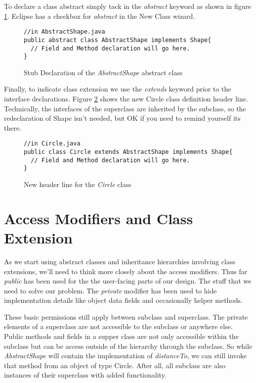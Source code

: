 \documentclass[]{tufte-handout}
\begin{document}
To declare a class abstract simply tack in the \textit{abstract} keyword as shown in figure \ref{fig:absclass}. Eclipse has a checkbox for \textit{abstract} in the New Class wizard.

\begin{figure}[!ht]
\begin{lstlisting}
//in AbstractShape.java
public abstract class AbstractShape implements Shape{
  // Field and Method declaration will go here. 
}
\end{lstlisting}
\label{fig:absclass}
\caption{Stub Declaration of the \textit{AbstractShape} abstract class}
\end{figure}

Finally, to indicate class extension we use the \textit{extends} keyword prior to the interface declarations. Figure \ref{fig:newcircle} shows the new Circle class definition header line. Technically, the interfaces of the superclass are inherited by the subclass, so the redeclaration of Shape isn't needed, but OK if you need to remind yourself its there. 

\begin{figure}[!ht]
\begin{lstlisting}
//in Circle.java
public class Circle extends AbstractShape implements Shape{
  // Field and Method declaration will go here. 
}
\end{lstlisting}
\label{fig:newcircle}
\caption{New header line for the \textit{Circle} class}
\end{figure}

\section{Access Modifiers and Class Extension}

As we start using abstract classes and inheritance hierarchies involving class extensions, we'll need to think more closely about the access modifiers.  Thus far \textit{public} has been used for the the user-facing parts of our design. The stuff that we need to solve our problem. The \textit{private} modifier has been used to hide implementation details like object data fields and occasionally helper methods. 

These basic permissions still apply between subclass and superclass. The private elements of a superclass are not accessible to the subclass or anywhere else. Public methods and fields in a supper class are not only accessible within the subclass but can be access outside of the hierarchy through the subclass. So while \textit{AbstractShape} will contain the implementation of \textit{distanceTo}, we can still invoke that method from an object of type Circle. After all, all subclass are also instances of their superclass with added functionality. 
\end{document}
